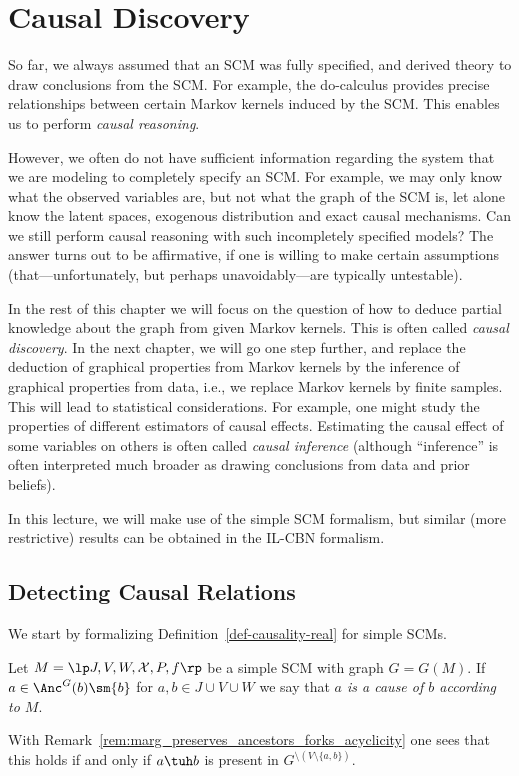 \section{Causal Discovery}

So far, we always assumed that an SCM was fully specified, and derived theory to 
draw conclusions from the SCM. For example, the do-calculus provides precise
relationships between certain Markov kernels induced by the SCM.
This enables us to perform \emph{causal reasoning}.

However, we often do not have sufficient information regarding the system that
we are modeling to completely specify an SCM. For example, we may only know what
the observed variables are, but not what the graph of the SCM is, let alone know the
latent spaces, exogenous distribution and exact causal mechanisms. Can we still
perform causal reasoning with such incompletely specified models? The answer turns
out to be affirmative, if one is willing to make certain assumptions (that---unfortunately, but perhaps unavoidably---are 
typically untestable).

In the rest of this chapter we will focus on the question of how to deduce partial knowledge about
the graph from given Markov kernels. This is often called \emph{causal 
discovery}. In the next chapter, we will go one step further, and replace the deduction
of graphical properties from Markov kernels by the inference of graphical properties
from data, i.e., we replace Markov kernels by finite samples. This will lead to 
statistical considerations. For example, one might study the properties of 
different estimators of causal effects. Estimating the causal effect of some variables
on others is often called \emph{causal inference} (although ``inference'' is often
interpreted much broader as drawing conclusions from data and prior beliefs).

In this lecture, we will make use of the simple SCM formalism, but similar (more restrictive) results can be obtained in the IL-CBN formalism.

\subsection{Detecting Causal Relations}

We start by formalizing Definition~\ref{def-causality-real} for simple SCMs.
\begin{Def}
  Let $M = \lt \Sin, \Send, \Srnd, \CX, P, f \rt$ be a simple SCM with graph $G = G(M)$.
  If $a \in \Anc^G(b)\sm \{b\}$ for $a, b \in J \cup V \cup W$ we say that \emph{$a$ is a cause of $b$ according to $M$}.
\end{Def}
With Remark~\ref{rem:marg_preserves_ancestors_forks_acyclicity} one sees that this holds if and only if
$a \tuh b$ is present in $G^{\setminus (V\setminus\{a,b\})}$.

